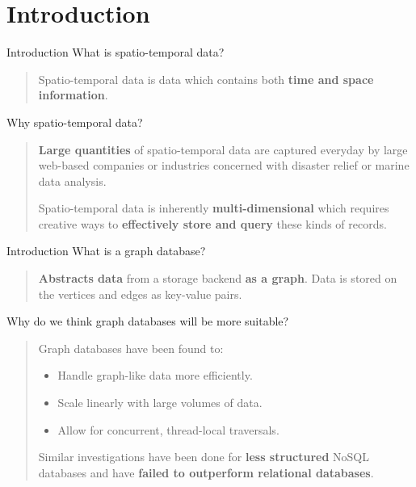 \section{Introduction}

\begin{frame}{Introduction}
    What is spatio-temporal data?
    \vfill
    \begin{quote}
        Spatio-temporal data is data which contains both \textbf{time and space information}.
    \end{quote}
    \vfill
    Why spatio-temporal data?
    \vfill
    \begin{quote}
        \textbf{Large quantities} of spatio-temporal data are captured everyday by large web-based companies or industries concerned with disaster relief or marine data analysis.
        
        \medskip
        
        Spatio-temporal data is inherently \textbf{multi-dimensional} which requires creative ways to \textbf{effectively store and query} these kinds of records.
    \end{quote}
\end{frame}

\begin{frame}{Introduction}
    What is a graph database?
    \vfill
    \begin{quote}
        \textbf{Abstracts data} from a storage backend \textbf{as a graph}. Data is stored on the vertices and edges as key-value pairs.
    \end{quote}
    \vfill
    Why do we think graph databases will be more suitable?
    \vfill
    \begin{quote}
    Graph databases have been found to:
    \medskip
        \begin{itemize}
            \item Handle graph-like data more efficiently.
            \item Scale linearly with large volumes of data.
            \item Allow for concurrent, thread-local traversals.
        \end{itemize}
    \medskip
    Similar investigations have been done for \textbf{less structured} NoSQL databases and have \textbf{failed to outperform relational databases}.
    \end{quote}
\end{frame}

